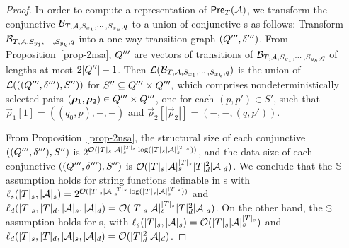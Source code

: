 \begin{proof}
In order to compute a representation of $\textsf{Pre}_{T}(\mathcal{A})$, we transform the conjunctive \SSA{} $\mathcal{B}_{T, \mathcal{A}, S_{x_1}, \cdots, S_{x_k},q}$ to a union of conjunctive \SA{}s as follows: Transform $\mathcal{B}_{T, \mathcal{A}, S_{y_1}, \cdots, S_{y_k}, q}$ into a one-way transition graph $(Q''',\delta''')$. From Proposition~\ref{prop-2nsa}, $Q'''$ are vectors of transitions of $\mathcal{B}_{T, \mathcal{A}, S_{y_1}, \cdots, S_{y_k}, q}$ of lengths at most $2|Q''|-1$. Then $\mathcal{L}(\mathcal{B}_{T, \mathcal{A}, S_{x_1}, \cdots, S_{x_k},q})$ is the union of $\mathcal{L}(((Q''',\delta'''), S''))$ for $S'' \subseteq Q''' \times Q''',$ which comprises nondeterministically selected pairs $(\vec{\rho}_1, \vec{\rho}_2) \in \controls''' \times \controls'''$, one for each $(p, p') \in S'$, such that $\vec{\rho}_1[1] = ((q_0, p), -, -)$ and  $\vec{\rho}_2[|\vec{\rho}_2|] = (-, -, (q, p'))$.

From Proposition~\ref{prop-2nsa}, 
the structural size of each conjunctive \SA{} $((Q''',\delta'''), S'')$ is 
$ 2^{\mathcal{O}( |T|_s |\mathcal{A}|_s^{|T|_s} \log (|T|_s |\mathcal{A}|_s^{|T|_s}))}$, 
and the data size of  each conjunctive \SA{} $((Q''',\delta'''), S'')$ is 
$ \mathcal{O}( |T|_s |\mathcal{A}|_s^{|T|_s} |T|^2_d |\mathcal{A}|_d )$. 
We conclude that 
the $\mathbb{S}$\prerec{} assumption holds for string functions definable in \SSPT{}s with $\ell_s(|T|_s, |\mathcal{A}|_s) = 2^{\mathcal{O}( |T|_s |\mathcal{A}|_s^{|T|_s} \log (|T|_s |\mathcal{A}|_s^{|T|_s}))}$ and $\ell_d(|T|_s, |T|_d, |\mathcal{A}|_s, |\mathcal{A}|_d) = \mathcal{O}(|T|_s |\mathcal{A}|_s^{|T|_s} |T|^2_d |\mathcal{A}|_d)$.
On the other hand, the $\mathbb{S}$\prerec{} assumption holds for \SPT{}s, with $\ell_s(|T|_s, |\mathcal{A}|_s) = \mathcal{O}(|T|_s |\mathcal{A}|_s^{|T|_s})$ and  $\ell_d(|T|_s, |T|_d, |\mathcal{A}|_s, |\mathcal{A}|_d) = \mathcal{O}(|T|^2_d |\mathcal{A}|_d)$.
\end{proof}



